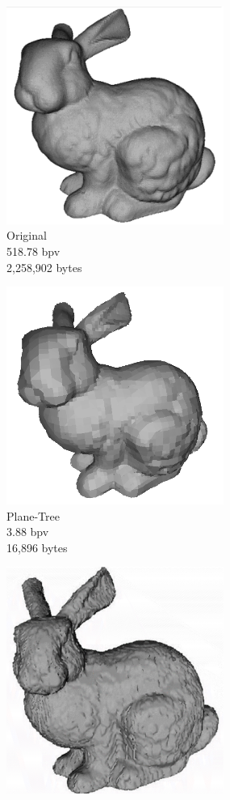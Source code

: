 \begin{figure}[H] 
        \begin{center}
 		\begin{subfigure}[b]{3in}
 			   \centering
 			   \includegraphics[width=2.8in]{images/experiments/pt_qual/original1}
 			   \captionsetup{justification=centering}
                \caption{Original\\518.78 bpv\\2,258,902 bytes}
                \label{fig:PT_SOTAQ1_ORIG}
        \end{subfigure}%
        \begin{subfigure}[b]{3in}
                \includegraphics[width=2.8in]{images/experiments/pt_qual/planetree_shade}
                \captionsetup{justification=centering}
                \caption{Plane-Tree\\3.88 bpv\\16,896 bytes}
                \label{fig:PT_SOTAQ1_PLT}
        \end{subfigure}
        \begin{subfigure}[b]{3in}
                \includegraphics[width=2.8in]{images/experiments/pt_qual/tg}

\end{subfigure}
\end{center}
\end{figure}
